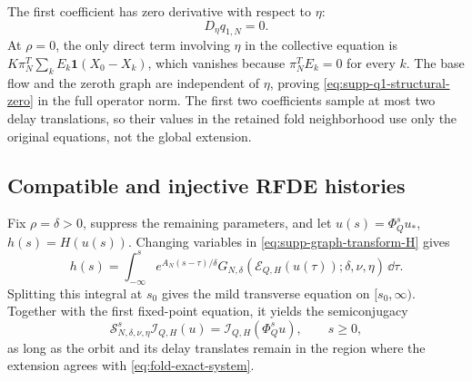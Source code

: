 The first coefficient has zero derivative with respect to \(\eta\):
\begin{equation}
 D_\eta q_{1,N}=0.
 \label{eq:supp-q1-structural-zero}
\end{equation}
At \(\rho=0\), the only direct term involving \(\eta\) in the collective equation
is
\(K\pi_N^T\sum_kE_k\mathbf1(X_0-X_k)\), which vanishes because
\(\pi_N^TE_k=0\) for every \(k\).  The base flow and the zeroth graph are
independent of \(\eta\), proving \eqref{eq:supp-q1-structural-zero} in the
full operator norm.  The first two coefficients sample at most two delay
translations, so their values in the retained fold neighborhood use only the original
equations, not the global extension.

\subsection{Compatible and injective RFDE histories}

Fix \(\rho=\delta>0\), suppress the remaining parameters, and let
\(u(s)=\Phi_Q^su_*\), \(h(s)=H(u(s))\).  Changing variables in
\eqref{eq:supp-graph-transform-H} gives
\begin{equation}
 h(s)=\int_{-\infty}^s
 e^{A_N(s-\tau)/\delta}
 G_{N,\delta}(\mathcal E_{Q,H}(u(\tau));\delta,\nu,\eta)
 \,\dd\tau.
 \label{eq:supp-complete-convolution}
\end{equation}
Splitting this integral at \(s_0\) gives the mild transverse equation on
\([s_0,\infty)\).  Together with the first fixed-point equation, it yields
the semiconjugacy
\begin{equation}
 \mathcal S_{N,\delta,\nu,\eta}^s\mathcal I_{Q,H}(u)
 =\mathcal I_{Q,H}(\Phi_Q^su),\qquad s\ge0,
 \label{eq:supp-semiconjugacy}
\end{equation}
as long as the orbit and its delay translates remain in the region where
the extension agrees with \cref{eq:fold-exact-system}.

